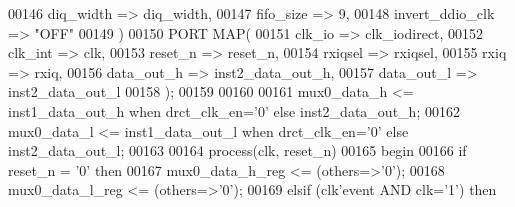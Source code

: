 \begin{DoxyCode}
00146                 diq_width           => diq_width,
00147                 fifo_size           => \textcolor{vhdllogic}{9},
00148                 invert_ddio_clk => \textcolor{keyword}{"OFF"}
00149             \textcolor{vhdlchar}{)}
00150 \textcolor{keywordflow}{PORT} \textcolor{keywordflow}{MAP}(
00151         clk_io      => clk_iodirect,
00152         clk_int     => clk,
00153         reset_n         => reset_n,
00154         rxiqsel         => rxiqsel,
00155         rxiq            => rxiq,
00156         data_out_h  => inst2_data_out_h,
00157         data_out_l  => inst2_data_out_l
00158         \textcolor{vhdlchar}{)};      
00159 
00160 
00161 \textcolor{vhdlchar}{mux0_data_h} \textcolor{vhdlchar}{<=} \textcolor{vhdlchar}{inst1_data_out_h} \textcolor{keywordflow}{when} \textcolor{vhdlchar}{drct_clk_en}\textcolor{vhdlchar}{=}\textcolor{vhdlchar}{'}\textcolor{vhdllogic}{}\textcolor{vhdllogic}{0}\textcolor{vhdlchar}{'} \textcolor{keywordflow}{else} \textcolor{vhdlchar}{inst2_data_out_h};
00162 \textcolor{vhdlchar}{mux0_data_l} \textcolor{vhdlchar}{<=} \textcolor{vhdlchar}{inst1_data_out_l} \textcolor{keywordflow}{when} \textcolor{vhdlchar}{drct_clk_en}\textcolor{vhdlchar}{=}\textcolor{vhdlchar}{'}\textcolor{vhdllogic}{}\textcolor{vhdllogic}{0}\textcolor{vhdlchar}{'} \textcolor{keywordflow}{else} \textcolor{vhdlchar}{inst2_data_out_l};
00163 
00164 \textcolor{keywordflow}{process}(clk, reset_n)
00165 \textcolor{vhdlkeyword}{begin }
00166     \textcolor{keywordflow}{if} \textcolor{vhdlchar}{reset_n} \textcolor{vhdlchar}{=} \textcolor{vhdlchar}{'}\textcolor{vhdllogic}{}\textcolor{vhdllogic}{0}\textcolor{vhdlchar}{'} \textcolor{keywordflow}{then} 
00167         \textcolor{vhdlchar}{mux0_data_h_reg} \textcolor{vhdlchar}{<=} \textcolor{vhdlchar}{(}\textcolor{keywordflow}{others}\textcolor{vhdlchar}{=}\textcolor{vhdlchar}{>}\textcolor{vhdlchar}{'}\textcolor{vhdllogic}{}\textcolor{vhdllogic}{0}\textcolor{vhdlchar}{'}\textcolor{vhdlchar}{)};
00168         \textcolor{vhdlchar}{mux0_data_l_reg} \textcolor{vhdlchar}{<=} \textcolor{vhdlchar}{(}\textcolor{keywordflow}{others}\textcolor{vhdlchar}{=}\textcolor{vhdlchar}{>}\textcolor{vhdlchar}{'}\textcolor{vhdllogic}{}\textcolor{vhdllogic}{0}\textcolor{vhdlchar}{'}\textcolor{vhdlchar}{)};
00169     \textcolor{keywordflow}{elsif} \textcolor{vhdlchar}{(}\textcolor{vhdlchar}{clk}\textcolor{vhdlchar}{'}\textcolor{vhdlkeyword}{event} \textcolor{keywordflow}{AND} \textcolor{vhdlchar}{clk}\textcolor{vhdlchar}{=}\textcolor{vhdlchar}{'}\textcolor{vhdllogic}{}\textcolor{vhdllogic}{1}\textcolor{vhdlchar}{'}\textcolor{vhdlchar}{)} \textcolor{keywordflow}{then} 

\end{DoxyCode}

